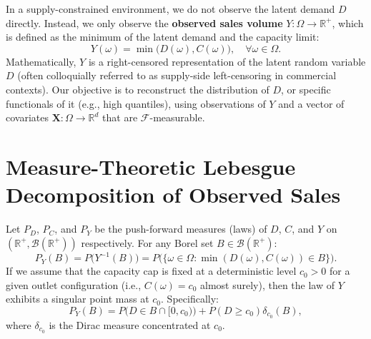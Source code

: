 \documentclass[11pt,a4paper]{article}
\theoremstyle{definition}
\begin{document}
In a supply-constrained environment, we do not observe the latent demand $D$ directly. Instead, we only observe the \textbf{observed sales volume} $Y: \Omega \to \mathbb{R}^+$, which is defined as the minimum of the latent demand and the capacity limit:
\begin{equation}\label{eq:censoring}
    Y(\omega) = \min\big(D(\omega), C(\omega)\big), \quad \forall \omega \in \Omega.
\end{equation}
Mathematically, $Y$ is a right-censored representation of the latent random variable $D$ (often colloquially referred to as supply-side left-censoring in commercial contexts). Our objective is to reconstruct the distribution of $D$, or specific functionals of it (e.g., high quantiles), using observations of $Y$ and a vector of covariates $\bm{X}: \Omega \to \mathbb{R}^d$ that are $\mathcal{F}$-measurable.

\section{Measure-Theoretic Lebesgue Decomposition of Observed Sales}
Let $P_D$, $P_C$, and $P_Y$ be the push-forward measures (laws) of $D$, $C$, and $Y$ on $(\mathbb{R}^+, \mathcal{B}(\mathbb{R}^+))$ respectively. For any Borel set $B \in \mathcal{B}(\mathbb{R}^+)$:
\begin{equation}
    P_Y(B) = P\big(Y^{-1}(B)\big) = P\big(\{\omega \in \Omega : \min(D(\omega), C(\omega)) \in B\}\big).
\end{equation}
If we assume that the capacity cap is fixed at a deterministic level $c_0 > 0$ for a given outlet configuration (i.e., $C(\omega) = c_0$ almost surely), then the law of $Y$ exhibits a singular point mass at $c_0$. Specifically:
\begin{equation}
    P_Y(B) = P\big(D \in B \cap [0, c_0)\big) + P(D \ge c_0) \delta_{c_0}(B),
\end{equation}
where $\delta_{c_0}$ is the Dirac measure concentrated at $c_0$.
\end{document}

